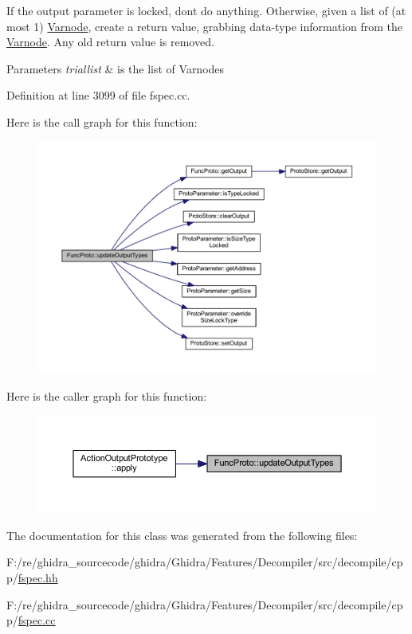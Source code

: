 If the output parameter is locked, don\textquotesingle{}t do anything. Otherwise, given a list of (at most 1) \mbox{\hyperlink{class_varnode}{Varnode}}, create a return value, grabbing data-\/type information from the \mbox{\hyperlink{class_varnode}{Varnode}}. Any old return value is removed. 
\begin{DoxyParams}{Parameters}
{\em triallist} & is the list of Varnodes \\
\hline
\end{DoxyParams}


Definition at line 3099 of file fspec.\+cc.

Here is the call graph for this function\+:
\nopagebreak
\begin{figure}[H]
\begin{center}
\leavevmode
\includegraphics[width=350pt]{class_func_proto_a56cbde2e23cdcf41ddb870721e02be6b_cgraph}
\end{center}
\end{figure}
Here is the caller graph for this function\+:
\nopagebreak
\begin{figure}[H]
\begin{center}
\leavevmode
\includegraphics[width=350pt]{class_func_proto_a56cbde2e23cdcf41ddb870721e02be6b_icgraph}
\end{center}
\end{figure}


The documentation for this class was generated from the following files\+:\begin{DoxyCompactItemize}
\item 
F\+:/re/ghidra\+\_\+sourcecode/ghidra/\+Ghidra/\+Features/\+Decompiler/src/decompile/cpp/\mbox{\hyperlink{fspec_8hh}{fspec.\+hh}}\item 
F\+:/re/ghidra\+\_\+sourcecode/ghidra/\+Ghidra/\+Features/\+Decompiler/src/decompile/cpp/\mbox{\hyperlink{fspec_8cc}{fspec.\+cc}}\end{DoxyCompactItemize}
